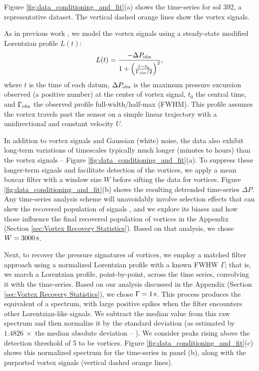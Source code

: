 \documentclass{aastex63}
\begin{document}
Figure \ref{fig:data_conditioning_and_fit}(a) shows the time-series for sol 392, a representative dataset. The vertical dashed orange lines show the vortex signals.

As in previous work \citep[e.g.][]{2016JGRE..121.1514K}, we model the vortex signals using a steady-state modified Lorentzian profile $L(t)$:
\begin{equation}
    L(t) = \frac{-\Delta P_{\rm obs}}{1 + \left( \frac{ t - t_0 }{\Gamma_{\rm obs}/2} \right)^2},\label{eqn:Lorentzian_profile}
\end{equation}
where $t$ is the time of each datum, $\Delta P_{\rm obs}$ is the maximum pressure excursion observed (a positive number) at the center of vortex signal, $t_0$ the central time, and $\Gamma_{\rm obs}$ the observed profile full-width/half-max (FWHM). This profile assumes the vortex travels past the sensor on a simple linear trajectory with a unidirectional and constant velocity $U$. 

In addition to vortex signals and Gaussian (white) noise, the data also exhibit long-term variations of timescales typically much longer (minutes to hours) than the vortex signals -- Figure \ref{fig:data_conditioning_and_fit}(a). To suppress these longer-term signals and facilitate detection of the vortices, we apply a mean boxcar filter with a window size $W$ before sifting the data for vortices. Figure \ref{fig:data_conditioning_and_fit}(b) shows the resulting detrended time-series $\Delta P$. Any time-series analysis scheme will unavoidably involve selection effects that can skew the recovered population of signals \citep{2018Icar..299..166J}, and we explore its biases and how those influence the final recovered population of vortices in the Appendix (Section \ref{sec:Vortex Recovery Statistics}). Based on that analysis, we chose $W = 3000\,{\rm s}$. 

Next, to recover the pressure signatures of vortices, we employ a matched filter approach \citep[][ch.~13]{Press2007} using a normalized Lorentzian profile with a known FWHW $\Gamma$; that is, we march a Lorentzian profile, point-by-point, across the time series, convolving it with the time-series. Based on our analysis discussed in the Appendix (Section \ref{sec:Vortex Recovery Statistics}), we chose $\Gamma = 1\,{\rm s}$. This process produces the equivalent of a spectrum, with large positive spikes when the filter encounters other Lorentzian-like signals. We subtract the median value from this raw spectrum and then normalize it by the standard deviation (as estimated by $1.4826\ \times$ the median absolute deviation -- \citealp{doi:10.1080/01621459.1993.10476408}). We consider peaks rising above the detection threshold of 5 to be vortices. Figure \ref{fig:data_conditioning_and_fit}(c) shows this normalized spectrum for the time-series in panel (b), along with the purported vortex signals (vertical dashed orange lines). 
\end{document}
